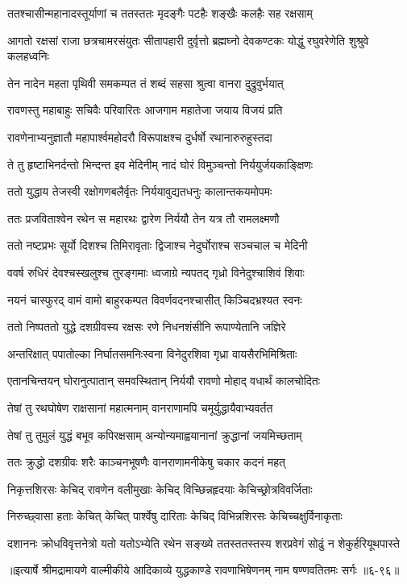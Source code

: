 \twolineshloka
{ततश्चासीन्महानादस्तूर्याणां च ततस्ततः}
{मृदङ्गैः पटहैः शङ्खैः कलहैः सह रक्षसाम्} %

\threelineshloka
{आगतो रक्षसां राजा छत्रचामरसंयुतः}
{सीतापहारी दुर्वृत्तो ब्रह्मघ्नो देवकण्टकः}
{योद्धुं रघुवरेणेति शुश्रुवे कलहध्वनिः} %

\twolineshloka
{तेन नादेन महता पृथिवी समकम्पत}
{तं शब्दं सहसा श्रुत्वा वानरा दुद्रुवुर्भयात्} %

\twolineshloka
{रावणस्तु महाबाहुः सचिवैः परिवारितः}
{आजगाम महातेजा जयाय विजयं प्रति} %

\twolineshloka
{रावणेनाभ्यनुज्ञातौ महापार्श्वमहोदरौ}
{विरूपाक्षश्च दुर्धर्षो रथानारुरुहुस्तदा} %

\twolineshloka
{ते तु हृष्टाभिनर्दन्तो भिन्दन्त इव मेदिनीम्}
{नादं घोरं विमुञ्चन्तो निर्ययुर्जयकाङ्क्षिणः} %

\twolineshloka
{ततो युद्धाय तेजस्वी रक्षोगणबलैर्वृतः}
{निर्ययावुद्यतधनुः कालान्तकयमोपमः} %

\twolineshloka
{ततः प्रजविताश्वेन रथेन स महारथः}
{द्वारेण निर्ययौ तेन यत्र तौ रामलक्ष्मणौ} %

\twolineshloka
{ततो नष्टप्रभः सूर्यो दिशश्च तिमिरावृताः}
{द्विजाश्च नेदुर्घोराश्च सञ्चचाल च मेदिनी} %

\twolineshloka
{ववर्ष रुधिरं देवश्चस्खलुश्च तुरङ्गमाः}
{ध्वजाग्रे न्यपतद् गृध्रो विनेदुश्चाशिवं शिवाः} %

\twolineshloka
{नयनं चास्फुरद् वामं वामो बाहुरकम्पत}
{विवर्णवदनश्चासीत् किञ्चिदभ्रश्यत स्वनः} %

\twolineshloka
{ततो निष्पततो युद्धे दशग्रीवस्य रक्षसः}
{रणे निधनशंसीनि रूपाण्येतानि जज्ञिरे} %

\twolineshloka
{अन्तरिक्षात् पपातोल्का निर्घातसमनिःस्वना}
{विनेदुरशिवा गृध्रा वायसैरभिमिश्रिताः} %

\twolineshloka
{एतानचिन्तयन् घोरानुत्पातान् समवस्थितान्}
{निर्ययौ रावणो मोहाद् वधार्थं कालचोदितः} %

\twolineshloka
{तेषां तु रथघोषेण राक्षसानां महात्मनाम्}
{वानराणामपि चमूर्युद्धायैवाभ्यवर्तत} %

\twolineshloka
{तेषां तु तुमुलं युद्धं बभूव कपिरक्षसाम्}
{अन्योन्यमाह्वयानानां क्रुद्धानां जयमिच्छताम्} %

\twolineshloka
{ततः क्रुद्धो दशग्रीवः शरैः काञ्चनभूषणैः}
{वानराणामनीकेषु चकार कदनं महत्} %

\twolineshloka
{निकृत्तशिरसः केचिद् रावणेन वलीमुखाः}
{केचिद् विच्छिन्नहृदयाः केचिच्छ्रोत्रविवर्जिताः} %

\twolineshloka
{निरुच्छ्वासा हताः केचित् केचित् पार्श्वेषु दारिताः}
{केचिद् विभिन्नशिरसः केचिच्चक्षुर्विनाकृताः} %

\twolineshloka
{दशाननः क्रोधविवृत्तनेत्रो यतो यतोऽभ्येति रथेन सङ्ख्ये}
{ततस्ततस्तस्य शरप्रवेगं सोढुं न शेकुर्हरियूथपास्ते} %


॥इत्यार्षे श्रीमद्रामायणे वाल्मीकीये आदिकाव्ये युद्धकाण्डे रावणाभिषेणनम् नाम षण्णवतितमः सर्गः ॥६-९६॥
